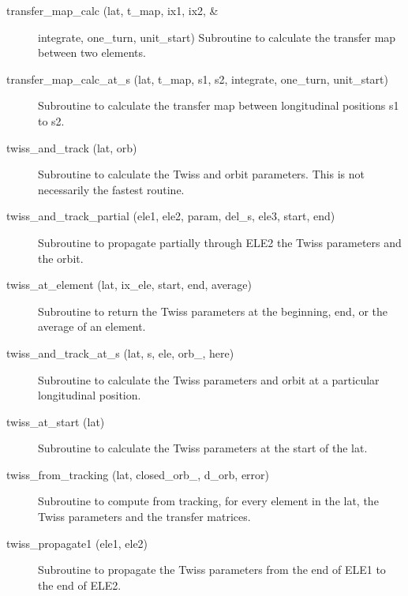\begin{description}
\label{r:transfer.map.calc}
\item[transfer_map_calc (lat, t_map, ix1, ix2, &] \Newline 
                                        integrate, one_turn, unit_start)
Subroutine to calculate the transfer map between two elements.

\label{r:transfer.map.calc.at.s}
\item[transfer_map_calc_at_s (lat, t_map, s1, s2, integrate, one_turn, unit_start)] \Newline 
Subroutine to calculate the transfer map between longitudinal positions
s1 to s2.

\item[twiss_and_track (lat, orb)] \Newline
Subroutine to calculate the Twiss and orbit parameters. 
This is not necessarily the fastest routine. 

\item[twiss_and_track_partial (ele1, ele2, param, del_s, ele3, start, end)] \Newline
Subroutine to propagate partially through ELE2 the Twiss parameters and the orbit. 

\label{r:twiss.at.element}
\item[twiss_at_element (lat, ix_ele, start, end, average)] \Newline
Subroutine to return the Twiss parameters at the beginning, end, or the average of an element. 

\item[twiss_and_track_at_s (lat, s, ele, orb_, here)] \Newline
Subroutine to calculate the Twiss parameters and orbit at a particular longitudinal position. 

\label{r:twiss.at.start}
\item[twiss_at_start (lat)] \Newline
Subroutine to calculate the Twiss parameters at the start of the lat. 

\label{r:twiss.from.tracking}
\item[twiss_from_tracking (lat, closed_orb_, d_orb, error)] \Newline
Subroutine to compute from tracking, for every element in the lat, 
the Twiss parameters and the transfer matrices. 

\label{r:twiss.propagate1}
\item[twiss_propagate1 (ele1, ele2)] \Newline
Subroutine to propagate the Twiss parameters from the end of ELE1 to the end of ELE2. 


\end{description}
